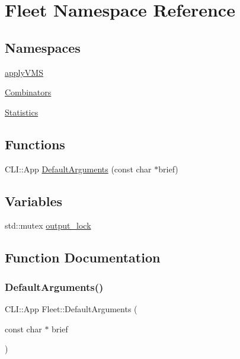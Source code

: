 \hypertarget{namespace_fleet}{}\section{Fleet Namespace Reference}
\label{namespace_fleet}
\subsection*{Namespaces}
\begin{DoxyCompactItemize}
\item 
 \hyperlink{namespace_fleet_1_1apply_v_m_s}{apply\+V\+MS}
\item 
 \hyperlink{namespace_fleet_1_1_combinators}{Combinators}
\item 
 \hyperlink{namespace_fleet_1_1_statistics}{Statistics}
\end{DoxyCompactItemize}
\subsection*{Functions}
\begin{DoxyCompactItemize}
\item 
C\+L\+I\+::\+App \hyperlink{namespace_fleet_a92846af38313a15b39c9ddc67e3d4f67}{Default\+Arguments} (const char $\ast$brief)
\end{DoxyCompactItemize}
\subsection*{Variables}
\begin{DoxyCompactItemize}
\item 
std\+::mutex \hyperlink{namespace_fleet_a491597c9b994a0860400d0eacf5af996}{output\+\_\+lock}
\end{DoxyCompactItemize}


\subsection{Function Documentation}
\mbox{\label{namespace_fleet_a92846af38313a15b39c9ddc67e3d4f67}} 
\subsubsection{\texorpdfstring{Default\+Arguments()}{DefaultArguments()}}
{\footnotesize\ttfamily C\+L\+I\+::\+App Fleet\+::\+Default\+Arguments (\begin{DoxyParamCaption}\item[{const char $\ast$}]{brief }\end{DoxyParamCaption})}



